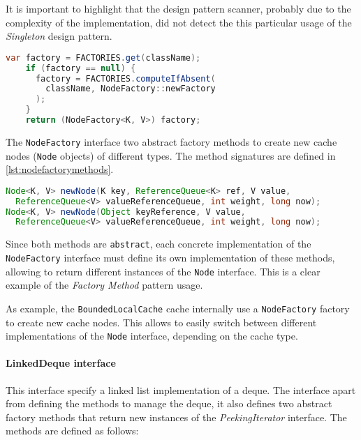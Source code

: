 It is important to highlight that the design pattern scanner, probably due to the complexity of the implementation, did not detect the this particular usage of the \textit{Singleton} design pattern.

\begin{lstlisting}[language=Java, caption={NodeFactory singleton design pattern implementation using a static \texttt{ConcurrentMap} instance}, captionpos=b, label={lst:nodefactorysingleton}]
    var factory = FACTORIES.get(className);
    if (factory == null) {
      factory = FACTORIES.computeIfAbsent(
        className, NodeFactory::newFactory
      );
    }
    return (NodeFactory<K, V>) factory;
\end{lstlisting}

\noindent The \texttt{NodeFactory} interface two abstract factory methods to create new cache nodes (\texttt{Node} objects) of different types. The method signatures are defined in \autoref{lst:nodefactorymethods}.

\begin{lstlisting}[language=Java, caption={NodeFactory abstract factory methods to create \texttt{Node} objects}, captionpos=b, label={lst:nodefactorymethods}]
Node<K, V> newNode(K key, ReferenceQueue<K> ref, V value,
  ReferenceQueue<V> valueReferenceQueue, int weight, long now);
Node<K, V> newNode(Object keyReference, V value,
  ReferenceQueue<V> valueReferenceQueue, int weight, long now);
\end{lstlisting}

\noindent Since both methods are \texttt{abstract}, each concrete implementation of the \texttt{NodeFactory} interface must define its own implementation of these methods, allowing to return different instances of the \texttt{Node} interface. This is a clear example of the \textit{Factory Method} pattern usage.

As example, the \texttt{BoundedLocalCache} cache internally use a \texttt{NodeFactory} factory to create new cache nodes. This allows to easily switch between different implementations of the \texttt{Node} interface, depending on the cache type.

\paragraph{LinkedDeque interface} This interface specify a linked list implementation of a deque. The interface apart from defining the methods to manage the deque, it also defines two abstract factory methods that return new instances of the \textit{PeekingIterator} interface. The methods are defined as follows:

